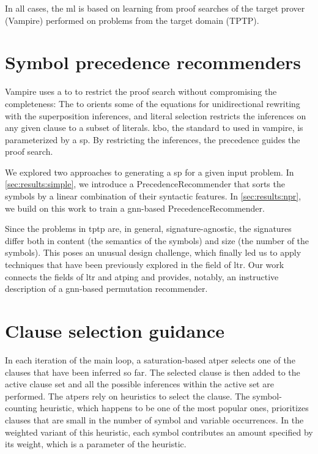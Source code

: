 In all cases, the \gls{ml} is based on learning from proof searches of the target prover (Vampire) performed on problems from the target domain (TPTP).

\section{Symbol precedence recommenders}

Vampire uses a \gls{to} to restrict the proof search without compromising the completeness:
The \gls{to} orients some of the equations for unidirectional rewriting with the superposition inferences,
and literal selection restricts the inferences on any given clause to a subset of literals.
\Gls{kbo}, the standard \gls{to} used in \gls{vampire}, is parameterized by a \gls{sp}.
By restricting the inferences, the precedence guides the proof search.

We explored two approaches to generating a \gls{sp} for a given input problem.
In \cref{sec:results:simple}, we introduce a \gls{PrecedenceRecommender} that sorts the symbols by a linear combination of their syntactic features.
In \cref{sec:results:npr}, we build on this work to train a \gls{gnn}-based \gls{PrecedenceRecommender}.

Since the problems in \gls{tptp} are, in general, signature-agnostic,
the signatures differ both in content (the semantics of the symbols) and size (the number of the symbols).
This poses an unusual design challenge,
which finally led us to apply techniques that have been previously explored in the field of \gls{ltr}.
Our work connects the fields of \gls{ltr} and \gls{atping} and provides, notably, an instructive description of a \gls{gnn}-based permutation recommender.

\section{Clause selection guidance}

In each iteration of the main loop,
a saturation-based \gls{atper} selects one of the clauses that have been inferred so far.
The selected clause is then added to the active clause set and all the possible inferences within the active set are performed.
The \glspl{atper} rely on heuristics to select the clause.
The symbol-counting heuristic, which happens to be one of the most popular ones,
prioritizes clauses that are small in the number of symbol and variable occurrences.
In the weighted variant of this heuristic,
each symbol contributes an amount specified by its weight,
which is a parameter of the heuristic.

